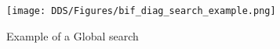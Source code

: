 \begin{figure}[!h]
    \centering
    \texttt{[image: DDS/Figures/bif\_diag\_search\_example.png]}
    \caption{Example of a Global search}
    \label{fig:bif_diag_search_example}
\end{figure}



